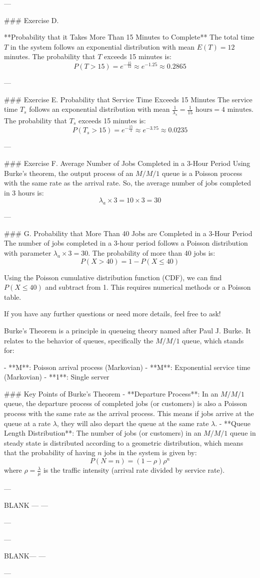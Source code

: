 ---

### Exercise D. 


**Probability that it Takes More Than 15 Minutes to Complete**
The total time $T$ in the system follows an exponential distribution with mean $E(T) = 12$ minutes. The probability that $T$ exceeds 15 minutes is:
$$P(T > 15) = e^{-\frac{15}{12}} \approx e^{-1.25} \approx 0.2865$$

---

### Exercise E. 
Probability that Service Time Exceeds 15 Minutes
The service time $T_s$ follows an exponential distribution with mean $\frac{1}{\lambda_s} = \frac{1}{15} \text{ hours} = 4 \text{ minutes}$. The probability that $T_s$ exceeds 15 minutes is:
$$P(T_s > 15) = e^{-\frac{15}{4}} \approx e^{-3.75} \approx 0.0235$$

---

### Exercise F.
 Average Number of Jobs Completed in a 3-Hour Period
Using Burke's theorem, the output process of an $M/M/1$ queue is a Poisson process with the same rate as the arrival rate. So, the average number of jobs completed in 3 hours is:
$$\lambda_a \times 3 = 10 \times 3 = 30$$

---

### G. Probability that More Than 40 Jobs are Completed in a 3-Hour Period
The number of jobs completed in a 3-hour period follows a Poisson distribution with parameter $\lambda_a \times 3 = 30$. The probability of more than 40 jobs is:
$$P(X > 40) = 1 - P(X \leq 40)$$

Using the Poisson cumulative distribution function (CDF), we can find $P(X \leq 40)$ and subtract from 1. This requires numerical methods or a Poisson table.

If you have any further questions or need more details, feel free to ask!

Burke's Theorem is a principle in queueing theory named after Paul J. Burke. It relates to the behavior of queues, specifically the $ M/M/1 $ queue, which stands for:

- **M**: Poisson arrival process (Markovian)
- **M**: Exponential service time (Markovian)
- **1**: Single server

### Key Points of Burke's Theorem
- **Departure Process**: In an $ M/M/1 $ queue, the departure process of completed jobs (or customers) is also a Poisson process with the same rate as the arrival process. This means if jobs arrive at the queue at a rate $ \lambda $, they will also depart the queue at the same rate $ \lambda $.
- **Queue Length Distribution**: The number of jobs (or customers) in an $ M/M/1 $ queue in steady state is distributed according to a geometric distribution, which means that the probability of having $ n $ jobs in the system is given by:
  $$P(N = n) = (1 - \rho) \rho^n$$
  where $ \rho = \frac{\lambda}{\mu} $ is the traffic intensity (arrival rate divided by service rate).


---

BLANK
---
---

---


---

BLANK---
---

---
